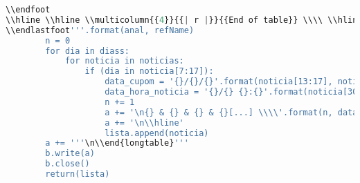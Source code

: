 \begin{lstlisting}[language=Python]
\\endfoot
\\hline \\hline \\multicolumn{{4}}{{| r |}}{{End of table}} \\\\ \\hline
\\endlastfoot'''.format(anal, refName)
        n = 0
        for dia in diass:
            for noticia in noticias:
                if (dia in noticia[7:17]):
                    data_cupom = '{}/{}/{}'.format(noticia[13:17], noticia[10:12], noticia[7:9])
                    data_hora_noticia = '{}/{} {}:{}'.format(noticia[30:32], noticia[27:29], noticia[45:47], noticia[57:59])
                    n += 1
                    a += '\n{} & {} & {} & {}[...] \\\\'.format(n, data_cupom, data_hora_noticia, noticia[noticia.find('titulo')+8:noticia.find('titulo')+49])
                    a += '\n\\hline'
                    lista.append(noticia)
        a += '''\n\\end{longtable}'''
        b.write(a)
        b.close()
        return(lista)


\end{lstlisting}